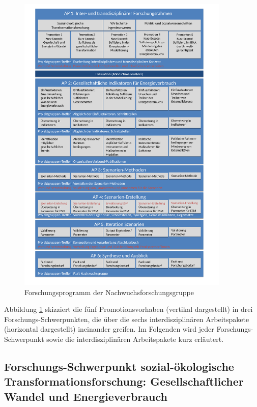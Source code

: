 \documentclass[a4paper,11pt,twoside]{scrartcl}
\begin{document}
\begin{figure}[!h]
    \centering
    \includegraphics[width=0.9\textwidth]{figures/Forschungsarbeit2.pdf}
    \caption{Forschungsprogramm der Nachwuchsforschungsgruppe}
    \label{fig:forschungsprogramm}
\end{figure}

Abbildung \ref{fig:forschungsprogramm} skizziert die fünf Promotionsvorhaben (vertikal dargestellt) in drei Forschungs-Schwerpunkten, die über die sechs interdisziplinären Arbeitspakete (horizontal dargestellt) ineinander greifen. Im Folgenden wird jeder Forschungs-Schwerpunkt sowie die interdisziplinären Arbeitspakete kurz erläutert.

\subsection*{Forschungs-Schwerpunkt sozial-ökologische Transformationsforschung: Gesellschaftlicher Wandel und Energieverbrauch}
\end{document}
